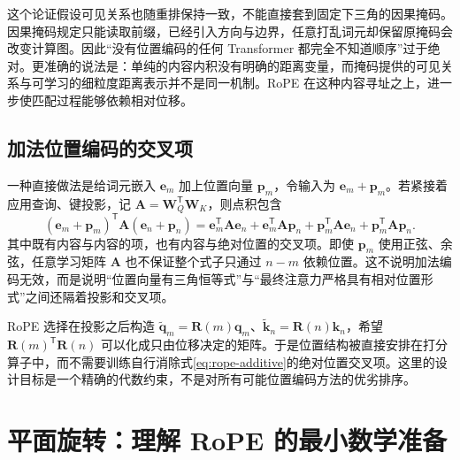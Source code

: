 \documentclass[UTF8,12pt,a4paper,fontset=fandol]{ctexart}
\begin{document}
这个论证假设可见关系也随重排保持一致，不能直接套到固定下三角的因果掩码。因果掩码规定只能读取前缀，已经引入方向与边界，任意打乱词元却保留原掩码会改变计算图。因此“没有位置编码的任何 Transformer 都完全不知道顺序”过于绝对。更准确的说法是：单纯的内容内积没有明确的距离变量，而掩码提供的可见关系与可学习的细粒度距离表示并不是同一机制。RoPE 在这种内容寻址之上，进一步使匹配过程能够依赖相对位移。

\subsection{加法位置编码的交叉项}
一种直接做法是给词元嵌入 $\mathbf e_m$ 加上位置向量 $\mathbf p_m$，令输入为 $\mathbf e_m+\mathbf p_m$。若紧接着应用查询、键投影，记 $\mathbf A=\mathbf W_Q^{\mathsf T}\mathbf W_K$，则点积包含
\begin{equation}
(\mathbf e_m+\mathbf p_m)^{\mathsf T}\mathbf A(\mathbf e_n+\mathbf p_n)
=\mathbf e_m^{\mathsf T}\mathbf A\mathbf e_n
+\mathbf e_m^{\mathsf T}\mathbf A\mathbf p_n
+\mathbf p_m^{\mathsf T}\mathbf A\mathbf e_n
+\mathbf p_m^{\mathsf T}\mathbf A\mathbf p_n.
\label{eq:rope-additive}
\end{equation}
其中既有内容与内容的项，也有内容与绝对位置的交叉项。即使 $\mathbf p_m$ 使用正弦、余弦，任意学习矩阵 $\mathbf A$ 也不保证整个式子只通过 $n-m$ 依赖位置。这不说明加法编码无效，而是说明“位置向量有三角恒等式”与“最终注意力严格具有相对位置形式”之间还隔着投影和交叉项。

RoPE 选择在投影之后构造 $\widetilde{\mathbf q}_m=\mathbf R(m)\mathbf q_m$、$\widetilde{\mathbf k}_n=\mathbf R(n)\mathbf k_n$，希望 $\mathbf R(m)^{\mathsf T}\mathbf R(n)$ 可以化成只由位移决定的矩阵。于是位置结构被直接安排在打分算子中，而不需要训练自行消除式\eqref{eq:rope-additive}的绝对位置交叉项。这里的设计目标是一个精确的代数约束，不是对所有可能位置编码方法的优劣排序。

\section{平面旋转：理解 RoPE 的最小数学准备}
\label{sec:rope-rotation}
\end{document}
